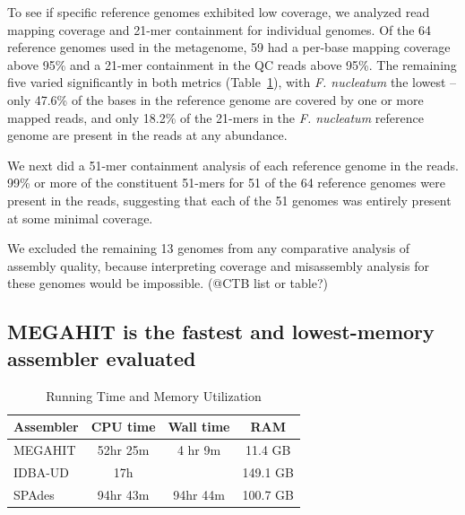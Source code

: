 \documentclass[11pt]{article}
\begin{document}
To see if specific reference genomes exhibited low coverage, we
analyzed read mapping coverage and 21-mer containment for individual
genomes.  Of the 64 reference genomes used in the metagenome, 59 had a
per-base mapping coverage above 95\% and a 21-mer containment in the
QC reads above 95\%.  The remaining five varied significantly in both
metrics (Table~\ref{table:time-memory}), with {\em F. nucleatum} the
lowest -- only 47.6\% of the bases in the reference genome are
covered by one or more mapped reads, and only 18.2\% of the 21-mers in
the {\em F. nucleatum} reference genome are present in the reads at
any abundance.


We next did a 51-mer containment analysis of each reference genome in
the reads.  99\% or more of the constituent 51-mers for 51 of the 64
reference genomes were present in the reads, suggesting that each
of the 51 genomes was entirely present at some minimal coverage.

We excluded the remaining 13 genomes from any comparative
analysis of assembly quality, because interpreting coverage and
misassembly analysis for these genomes would be impossible.
(@CTB list or table?)



\subsection*{MEGAHIT is the fastest and lowest-memory assembler evaluated}

 \begin{table}[h]
\caption{Running Time and Memory Utilization}
\centering
\begin{tabular}{|l|c|c|c|}
\hline
\textbf{Assembler} & \textbf{CPU time} & \textbf{Wall time} & \textbf{RAM} \\ [0.5ex]
\hline
MEGAHIT & 52hr 25m & 4 hr 9m & 11.4 GB \\
\hline
IDBA-UD & 17h & & 149.1 GB \\
\hline
SPAdes & 94hr 43m & 94hr 44m & 100.7 GB \\
\hline

\end{tabular}
\label{table:time-memory}
\end{table}
\end{document}
